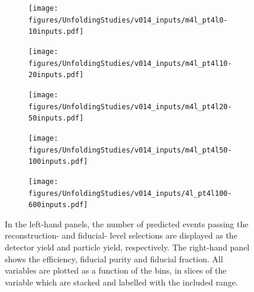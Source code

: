 \begin{figure}[htb]
    \begin{subfigure}{.99\textwidth}\centering
        \texttt{[image: figures/UnfoldingStudies/v014\_inputs/m4l\_pt4l0-10inputs.pdf]}
    \end{subfigure}
    \begin{subfigure}{.99\textwidth}\centering
        \texttt{[image: figures/UnfoldingStudies/v014\_inputs/m4l\_pt4l10-20inputs.pdf]}
    \end{subfigure}
    \begin{subfigure}{.99\textwidth}\centering
        \texttt{[image: figures/UnfoldingStudies/v014\_inputs/m4l\_pt4l20-50inputs.pdf]}
    \end{subfigure}
    \begin{subfigure}{.99\textwidth}\centering
        \texttt{[image: figures/UnfoldingStudies/v014\_inputs/m4l\_pt4l50-100inputs.pdf]}
    \end{subfigure}
    \begin{subfigure}{.99\textwidth}\centering
        \texttt{[image: figures/UnfoldingStudies/v014\_inputs/4l\_pt4l100-600inputs.pdf]}
    \end{subfigure}   
    \caption{In the left-hand panels, the number of predicted events passing the reconstruction- and fiducial- level selections are displayed as the detector yield and particle yield, respectively. The right-hand panel shows the efficiency, fiducial purity and fiducial fraction. All variables are plotted as a function of the \mFourL bins, in slices of the \ptFourL variable which are stacked and labelled with the included \ptFourL range.
    \label{fig:pt4lunf}}
\end{figure}  

\FloatBarrier
\clearpage

